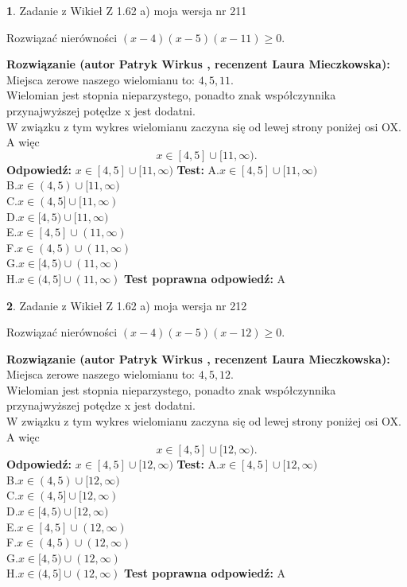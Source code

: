 \documentclass[12pt, a4paper]{article}
\theoremstyle{definition} %
\newtheorem{zad}{}
\newcommand{\zadStart}[1]{\begin{zad}#1\newline}
\newcommand{\zadStop}{\end{zad}}
\newcommand{\rozwStart}[2]{\noindent \textbf{Rozwiązanie (autor #1 , recenzent #2): }\newline}
\newcommand{\rozwStop}{\newline}
\newcommand{\odpStart}{\noindent \textbf{Odpowiedź:}\newline}
\newcommand{\odpStop}{\newline}
\newcommand{\testStart}{\noindent \textbf{Test:}\newline}
\newcommand{\testStop}{\newline}
\newcommand{\kluczStart}{\noindent \textbf{Test poprawna odpowiedź:}\newline}
\newcommand{\kluczStop}{\newline}
\begin{document}
\zadStart{Zadanie z Wikieł Z 1.62 a) moja wersja nr 211}

Rozwiązać nierówności $(x-4)(x-5)(x-11)\ge0$.
\zadStop
\rozwStart{Patryk Wirkus}{Laura Mieczkowska}
Miejsca zerowe naszego wielomianu to: $4, 5, 11$.\\
Wielomian jest stopnia nieparzystego, ponadto znak współczynnika przy\linebreak najwyższej potędze x jest dodatni.\\ W związku z tym wykres wielomianu zaczyna się od lewej strony poniżej osi OX. A więc $$x \in [4,5] \cup [11,\infty).$$
\rozwStop
\odpStart
$x \in [4,5] \cup [11,\infty)$
\odpStop
\testStart
A.$x \in [4,5] \cup [11,\infty)$\\
B.$x \in (4,5) \cup [11,\infty)$\\
C.$x \in (4,5] \cup [11,\infty)$\\
D.$x \in [4,5) \cup [11,\infty)$\\
E.$x \in [4,5] \cup (11,\infty)$\\
F.$x \in (4,5) \cup (11,\infty)$\\
G.$x \in [4,5) \cup (11,\infty)$\\
H.$x \in (4,5] \cup (11,\infty)$
\testStop
\kluczStart
A
\kluczStop



\zadStart{Zadanie z Wikieł Z 1.62 a) moja wersja nr 212}

Rozwiązać nierówności $(x-4)(x-5)(x-12)\ge0$.
\zadStop
\rozwStart{Patryk Wirkus}{Laura Mieczkowska}
Miejsca zerowe naszego wielomianu to: $4, 5, 12$.\\
Wielomian jest stopnia nieparzystego, ponadto znak współczynnika przy\linebreak najwyższej potędze x jest dodatni.\\ W związku z tym wykres wielomianu zaczyna się od lewej strony poniżej osi OX. A więc $$x \in [4,5] \cup [12,\infty).$$
\rozwStop
\odpStart
$x \in [4,5] \cup [12,\infty)$
\odpStop
\testStart
A.$x \in [4,5] \cup [12,\infty)$\\
B.$x \in (4,5) \cup [12,\infty)$\\
C.$x \in (4,5] \cup [12,\infty)$\\
D.$x \in [4,5) \cup [12,\infty)$\\
E.$x \in [4,5] \cup (12,\infty)$\\
F.$x \in (4,5) \cup (12,\infty)$\\
G.$x \in [4,5) \cup (12,\infty)$\\
H.$x \in (4,5] \cup (12,\infty)$
\testStop
\kluczStart
A
\kluczStop
\end{document}
